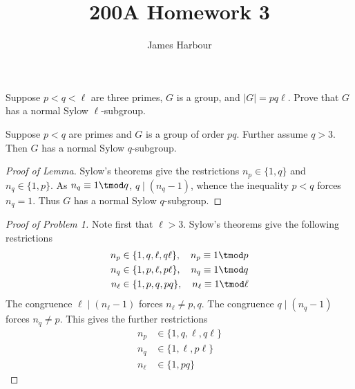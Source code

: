 \documentclass[12pt]{article}
\title{200A Homework 3}
\author{James Harbour}
\begin{document}
\maketitle
\begin{homeworkProblem}
  Suppose $p < q < \ell$ are three primes, $G$ is a group, and $\lvert G\rvert = pq\ell$.  
  Prove that $G$ has a normal Sylow $\ell$-subgroup.  

  \begin{lemma}
    Suppose $ p<q $ are primes and $ G $ is a group of order $ pq $. Further assume $ q>3 $. Then $ G $ has a normal Sylow $ q $-subgroup.
  \end{lemma}
  \begin{proof}[Proof of Lemma]
    Sylow's theorems give the restrictions $ n_{p}\in \{1, q\} $ and $ n_{q}\in\{1,p\} $. As $ n_{q}\equiv 1\tmod q $, $ q\mid (n_{q}-1) $, whence the inequality $ p<q $ forces $ n_{q}=1 $. Thus $ G $ has a normal Sylow $ q $-subgroup.
  \end{proof}
  \begin{proof}[Proof of Problem 1]

    Note first that $ \ell >3 $. Sylow's theorems give the following restrictions
    \begin{align*}
      n_{p} &\in \{1,q,\ell,q\ell\}, \quad n_{p} \equiv 1\tmod p\\
      n_{q} &\in \{1,p,\ell, p\ell\},\quad n_{q} \equiv  1\tmod q\\
      n_{\ell} &\in \{1, p, q, pq\},\quad n_{\ell} \equiv 1 \tmod \ell
    \end{align*}
    The congruence $ \ell \mid (n_{\ell}-1) $ forces $ n_{\ell}\neq p,q $. The congruence $ q\mid(n_{q}-1) $ forces $ n_{q}\neq p $. This gives the further restrictions
    \begin{align*}
      n_{p} &\in \{1,q,\ell,q\ell\}\\
      n_{q} &\in \{1,\ell, p\ell\}\\
      n_{\ell} &\in \{1,  pq\}
    \end{align*}


\end{proof}
\end{homeworkProblem}
\end{document}
